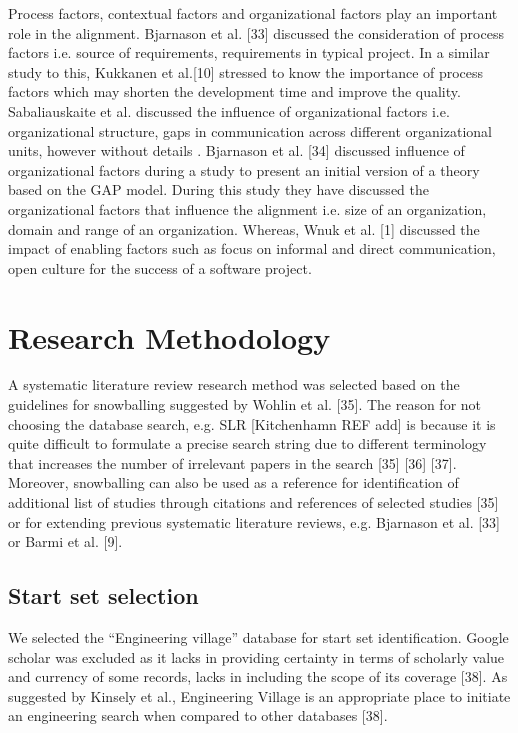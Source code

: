 \documentclass{article}
\begin{document}
Process factors, contextual factors and organizational factors play an important role in the alignment. Bjarnason et al. [33] discussed the consideration of process factors i.e. source of requirements, requirements in typical project. In a similar study to this, Kukkanen et al.[10] stressed to know the importance of process factors which may shorten the development time and improve the quality. Sabaliauskaite et al.  \cite{sabaliauskaite2010challenges} discussed the influence of organizational factors i.e. organizational structure, gaps in communication across different organizational units, however without details .  Bjarnason et al. [34] discussed influence of organizational factors during a study to present an initial version of a theory based on the GAP model. During this study they have discussed the organizational factors that influence the alignment i.e. size of an organization, domain and range of an organization. Whereas, Wnuk et al. [1] discussed the impact of enabling factors such as focus on informal and direct communication, open culture for the success of a software project.

\section{Research Methodology}\label{RM}
A systematic literature review research method was selected based on the guidelines for snowballing suggested by Wohlin et al. [35]. The reason for not choosing the database search, e.g. SLR [Kitchenhamn REF add] is because it is quite difficult to formulate a precise search string due to different terminology that increases the number of irrelevant papers in the search [35] [36] [37]. Moreover, snowballing can also be used as a reference for identification of additional list of studies through citations and references of selected studies [35] or for extending previous systematic literature reviews, e.g. Bjarnason et al. [33] or Barmi et al. [9].

\subsection{Start set selection }
We selected the “Engineering village” database for start set identification. Google scholar was excluded as it lacks in providing certainty in terms of scholarly value and currency of some records, lacks in including the scope of its coverage [38]. As suggested by Kinsely et al.,  Engineering Village is an appropriate place to initiate an engineering search when compared to other databases [38]. 
\end{document}
